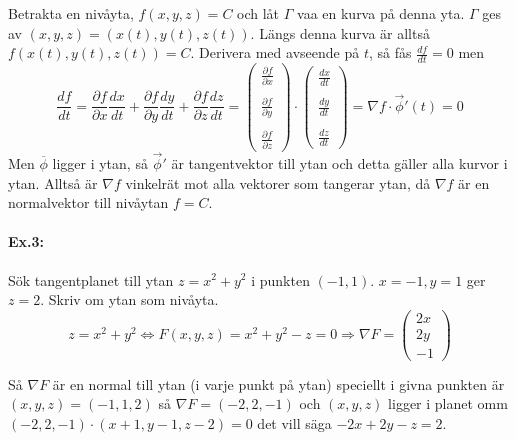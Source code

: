 \documentclass[a4paper,12pt]{article}
\newcommand{\partialfrac}[2]{\frac{\partial #1}{\partial #2}}
\begin{document}
  Betrakta en nivåyta, $f(x,y,z) = C$ och låt $\Gamma$ vaa en kurva på denna
  yta. $\Gamma$ ges av $(x,y,z)=(x(t),y(t),z(t))$. Längs denna kurva är alltså
  $f(x(t), y(t), z(t)) = C$. Derivera med avseende på $t$, så fås
  $\frac{df}{dt}=0$ men
  \begin{equation*}
    \frac{df}{dt} =
    \partialfrac{f}{x} \frac{dx}{dt} +
    \partialfrac{f}{y} \frac{dy}{dt} +
    \partialfrac{f}{z} \frac{dz}{dt} =
    \begin{pmatrix}
      \partialfrac{f}{x} \\\\
      \partialfrac{f}{y} \\\\
      \partialfrac{f}{z}
    \end{pmatrix}
    \cdot
    \begin{pmatrix}
      \frac{dx}{dt} \\\\
      \frac{dy}{dt} \\\\
      \frac{dz}{dt}
    \end{pmatrix}
    = \nabla f \cdot \vec{\phi}'(t) = 0
  \end{equation*}
  Men $\overline{\phi}$ ligger i ytan, så $\vec{\phi}'$ är tangentvektor
  till ytan och detta gäller alla kurvor i ytan. Alltså är $\nabla f$ vinkelrät
  mot alla vektorer som tangerar ytan, då $\nabla f$ är en normalvektor till
  nivåytan $f = C$.

\paragraph{Ex.3:}
  Sök tangentplanet till ytan $z = x^2+y^2$ i punkten $(-1,1)$. $x=-1, y=1$ ger
  $z=2$. Skriv om ytan som nivåyta.
  \begin{equation*}
    z=x^2+y^2 \Leftrightarrow F(x,y,z) = x^2+y^2-z = 0
    \Rightarrow \nabla F =
    \begin{pmatrix}
      2x \\
      2y \\
      -1
    \end{pmatrix}
  \end{equation*}

  Så $\nabla F$ är en normal till ytan (i varje punkt på ytan) speciellt i givna
  punkten är $(x,y,z)=(-1,1,2)$ så $\nabla F = (-2, 2, -1)$ och $(x,y,z)$ ligger
  i planet omm \\$(-2,2,-1) \cdot (x+1, y-1, z-2) = 0$ det vill säga
  $-2x+2y-z = 2$.
\end{document}
